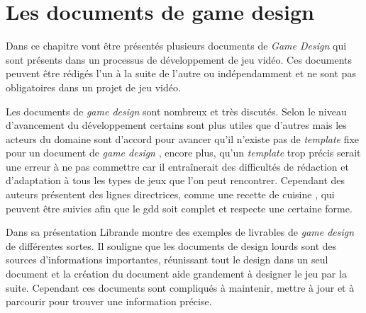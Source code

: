\chapter{Les documents de game design}

Dans ce chapitre vont être présentés plusieurs documents de \emph{Game Design} qui sont présents dans un processus de développement de jeu vidéo. Ces documents peuvent être rédigés l'un à la suite de l'autre ou indépendamment et ne sont pas obligatoires dans un projet de jeu vidéo.

Les documents de \emph{game design} sont nombreux et très discutés. Selon le niveau d'avancement du développement certains sont plus utiles que d'autres mais les acteurs du domaine sont d'accord pour avancer qu'il n'existe pas de \emph{template} fixe pour un document de \emph{game design} \cite{GD_theory_rouse}, encore plus, qu'un \emph{template} trop précis serait une erreur à ne pas commettre car il entraînerait des difficultés de rédaction et d'adaptation à tous les types de jeux que l'on peut rencontrer. Cependant des auteurs présentent des lignes directrices, comme une recette de cuisine \cite{LevelUpRogers2014}, qui peuvent être suivies afin que le \gls{gdd} soit complet et respecte une certaine forme. 

Dans sa présentation Librande \cite{onepage_librande} montre des exemples de livrables de \emph{game design} de différentes sortes. Il souligne que les documents de design lourds sont des sources d'informations importantes, réunissant tout le design dans un seul document et la création du document aide grandement à designer le jeu par la suite. Cependant ces documents sont compliqués à maintenir, mettre à jour et à parcourir pour trouver une information précise.

